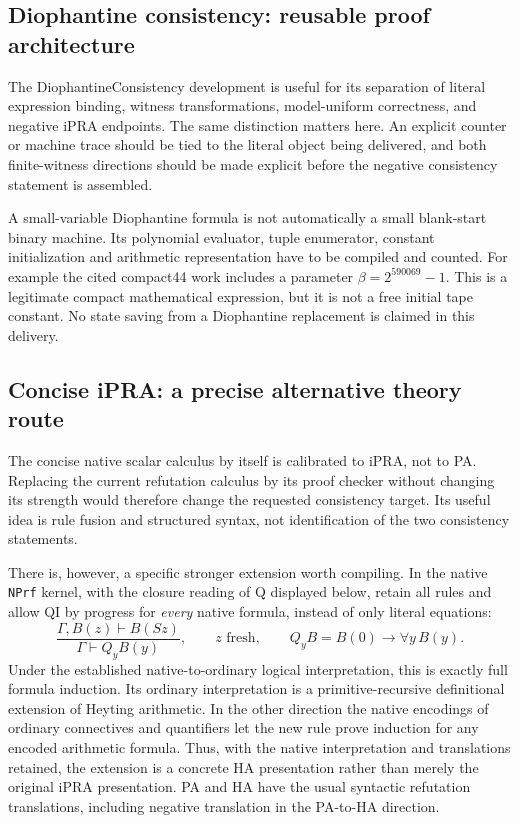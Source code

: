 \documentclass[11pt,letterpaper]{article}
\newcommand{\file}[1]{\texttt{\nolinkurl{#1}}}
\begin{document}
\subsection{Diophantine consistency: reusable proof architecture}

The DiophantineConsistency development is useful for its separation of
literal expression binding, witness transformations, model-uniform
correctness, and negative iPRA endpoints. The same distinction matters
here. An explicit counter or machine trace should be tied to the literal
object being delivered, and both finite-witness directions should be
made explicit before the negative consistency statement is assembled.

A small-variable Diophantine formula is not automatically a small
blank-start binary machine. Its polynomial evaluator, tuple enumerator,
constant initialization and arithmetic representation have to be compiled
and counted. For example the cited compact44 work includes a parameter
$\beta=2^{590069}-1$. This is a legitimate compact mathematical expression,
but it is not a free initial tape constant. No state saving from a
Diophantine replacement is claimed in this delivery.

\subsection{Concise iPRA: a precise alternative theory route}

The concise native scalar calculus by itself is calibrated to iPRA, not
to PA. Replacing the current refutation calculus by its proof checker
without changing its strength would therefore change the requested
consistency target. Its useful idea is rule fusion and structured syntax,
not identification of the two consistency statements.

There is, however, a specific stronger extension worth compiling. In the
native \file{NPrf} kernel, with the closure reading of Q displayed below,
retain all rules and allow QI by progress for
\emph{every} native formula, instead of only literal equations:
\[
 \frac{\Gamma,B(z)\vdash B(Sz)}{\Gamma\vdash Q_y B(y)},
 \qquad z\text{ fresh},\qquad Q_yB=B(0)\to\forall y\,B(y).
\]
Under the established native-to-ordinary logical interpretation, this is
exactly full formula induction. Its ordinary interpretation is a
primitive-recursive definitional extension of Heyting arithmetic. In the
other direction the native encodings of ordinary connectives and
quantifiers let the new rule prove induction for any encoded arithmetic
formula. Thus, with the native interpretation and translations retained,
the extension is a concrete HA presentation rather than merely the
original iPRA presentation. PA and HA have the usual syntactic refutation
translations, including negative translation in the PA-to-HA direction.
\end{document}
